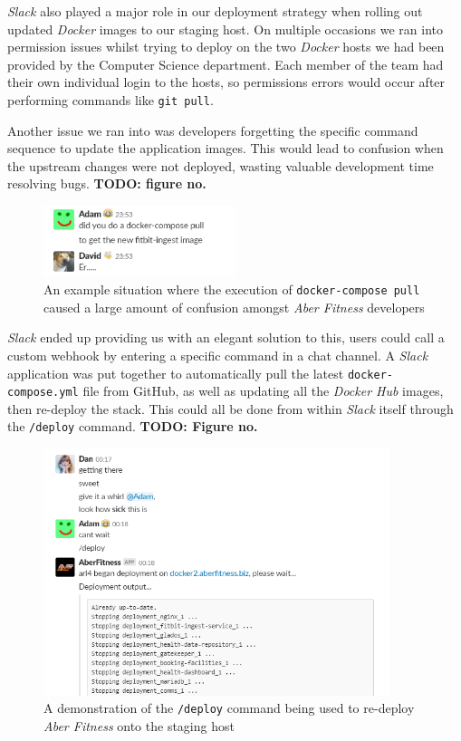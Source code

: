 \par
\textit{Slack} also played a major role in our deployment strategy when rolling out updated \textit{Docker} images to our staging host. On multiple occasions we ran into permission issues whilst trying to deploy on the two \textit{Docker} hosts we had been provided by the Computer Science department. Each member of the team had their own individual login to the hosts, so permissions errors would occur after performing commands like \lstinline{git pull}. 

\par
Another issue we ran into was developers forgetting the specific command sequence to update the application images. This would lead to confusion when the upstream changes were not deployed, wasting valuable development time resolving bugs. \textbf{TODO: figure no.}

\begin{figure}[H]
    \centering
    \includegraphics[width=0.5\textwidth]{Images/aberfitness_slack_bot_reason_why.png}
    \caption{An example situation where the execution of \lstinline{docker-compose pull} caused a large amount of confusion amongst \textit{Aber Fitness} developers}
\end{figure}

\par
\textit{Slack} ended up providing us with an elegant solution to this, users could call a custom webhook by entering a specific command in a chat channel. A \textit{Slack} application was put together to automatically pull the latest \lstinline{docker-compose.yml} file from GitHub, as well as updating all the \textit{Docker Hub} images, then re-deploy the stack. This could all be done from within \textit{Slack} itself through the \lstinline{/deploy} command. \textbf{TODO: Figure no.}

\begin{figure}[H]
    \centering
    \includegraphics[width=0.9\textwidth]{Images/aberfitness_slack_bot.png}
    \caption{A demonstration of the \lstinline{/deploy} command being used to re-deploy \textit{Aber Fitness} onto the staging host}
\end{figure}

